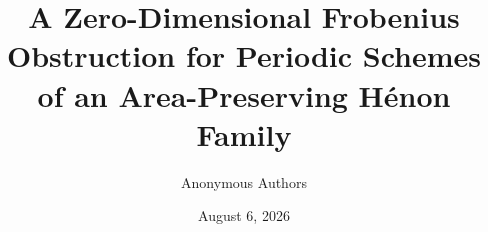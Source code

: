 \documentclass[11pt]{article}
\title{A Zero-Dimensional Frobenius Obstruction for Periodic Schemes\\
of an Area-Preserving H\'enon Family}
\author{Anonymous Authors}
\date{August 6, 2026}
\theoremstyle{definition}
\theoremstyle{remark}
\begin{document}
\maketitle

\begin{abstract}

\end{abstract}












\appendix

\end{document}
